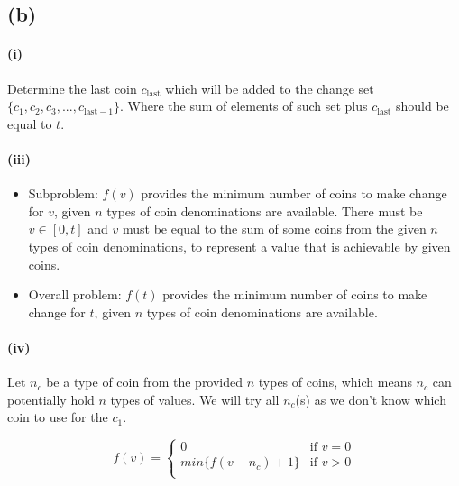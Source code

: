 \documentclass[11pt]{article}
\begin{document}
\subsection{(b)}


\paragraph{(i)} Determine the last coin $c_{\text{last}}$ which will be added to the change set $\{c_1, c_2, c_3, ..., c_{\text{last}-1}\}$. Where the sum of elements of such set plus $c_{\text{last}}$ should be equal to $t$.


\paragraph{(iii)}

\begin{itemize}
    \item Subproblem: $f(v)$ provides the minimum number of coins to make change for $v$, given $n$ types of coin denominations are available. There must be  $v \in [0, t]$ and $v$ must be equal to the sum of some coins from the given $n$ types of coin denominations, to represent a value that is achievable by given coins.
    \item Overall problem: $f(t)$ provides the minimum number of coins to make change for $t$, given $n$ types of coin denominations are available.
\end{itemize}


\paragraph{(iv)}

Let $n_c$ be a type of coin from the provided $n$ types of coins, which means $n_c$ can potentially hold $n$ types of values. We will try all $n_c$(s) as we don't know which coin to use for the $c_1$.


\begin{equation}
    f(v) =
    \begin{cases}
        0 & \text{if \ } v = 0 \\
        min\{f(v - n_c) + 1\} & \text{if \ } v > 0 \\
    \end{cases}\nonumber
\end{equation}
\end{document}
